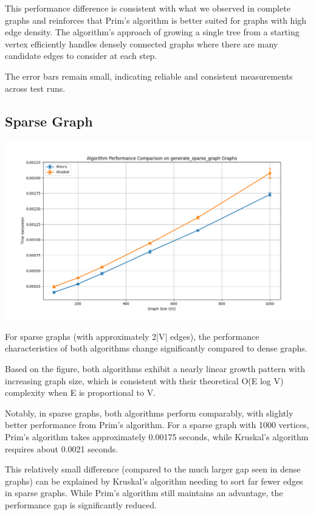 \documentclass[a4paper,12pt]{article}
\begin{document}
This performance difference is consistent with what we observed in complete graphs and reinforces that Prim's algorithm is better suited for graphs with high edge density. The algorithm's approach of growing a single tree from a starting vertex efficiently handles densely connected graphs where there are many candidate edges to consider at each step.

The error bars remain small, indicating reliable and consistent measurements across test runs.
\subsection{Sparse Graph}
\label{sec:org274af69}
\begin{center}
\includegraphics[width=.9\linewidth]{mst_sparse.png}
\label{org7dccec3}
\end{center}

For sparse graphs (with approximately 2|V| edges), the performance characteristics of both algorithms change significantly compared to dense graphs.

Based on the figure, both algorithms exhibit a nearly linear growth pattern with increasing graph size, which is consistent with their theoretical O(E log V) complexity when E is proportional to V. 

Notably, in sparse graphs, both algorithms perform comparably, with slightly better performance from Prim's algorithm. For a sparse graph with 1000 vertices, Prim's algorithm takes approximately 0.00175 seconds, while Kruskal's algorithm requires about 0.0021 seconds.

This relatively small difference (compared to the much larger gap seen in dense graphs) can be explained by Kruskal's algorithm needing to sort far fewer edges in sparse graphs. While Prim's algorithm still maintains an advantage, the performance gap is significantly reduced.
\end{document}
